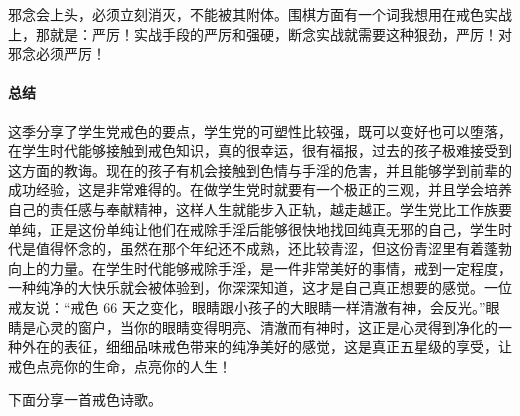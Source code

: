 邪念会上头，必须立刻消灭，不能被其附体。围棋方面有一个词我想用在戒色实战上，那就是：严厉！实战手段的严厉和强硬，断念实战就需要这种狠劲，严厉！对邪念必须严厉！

\paragraph*{总结}

这季分享了学生党戒色的要点，学生党的可塑性比较强，既可以变好也可以堕落，在学生时代能够接触到戒色知识，真的很幸运，很有福报，过去的孩子极难接受到这方面的教诲。现在的孩子有机会接触到色情与手淫的危害，并且能够学到前辈的成功经验，这是非常难得的。在做学生党时就要有一个极正的三观，并且学会培养自己的责任感与奉献精神，这样人生就能步入正轨，越走越正。学生党比工作族要单纯，正是这份单纯让他们在戒除手淫后能够很快地找回纯真无邪的自己，学生时代是值得怀念的，虽然在那个年纪还不成熟，还比较青涩，但这份青涩里有着蓬勃向上的力量。在学生时代能够戒除手淫，是一件非常美好的事情，戒到一定程度，一种纯净的大快乐就会被体验到，你深深知道，这才是自己真正想要的感觉。一位戒友说：“戒色 66 天之变化，眼睛跟小孩子的大眼睛一样清澈有神，会反光。”眼睛是心灵的窗户，当你的眼睛变得明亮、清澈而有神时，这正是心灵得到净化的一种外在的表征，细细品味戒色带来的纯净美好的感觉，这是真正五星级的享受，让戒色点亮你的生命，点亮你的人生！

下面分享一首戒色诗歌。

